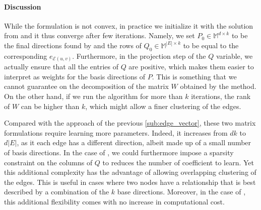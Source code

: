 \paragraph{Discussion}

While the \pqt{} formulation is not convex, in practice we initialize it with the solution from
\combined{} and it thus converge after few iterations. Namely, we set $P_0 \in \mathbb{M}^{d\times
k}$ to be the final directions found by \combined{} and the rows of $Q_0 \in \mathbb{M}^{|E|\times
k}$ to be equal to the corresponding $e_{\mathcal{E}(u,v)}$. Furthermore, in the projection
step of the $Q$ variable, we actually ensure that all the entries of $Q$ are positive, which makes
them easier to  interpret as weights for the basis directions of $P$. This is something that we
cannot guarantee on the decomposition of the matrix $W$ obtained by the \fwa{} method. On the other
hand, if we run the \fwa{} algorithm for more than $k$ iterations, the rank of $W$ can be higher
than $k$, which might allow a finer clustering of the edges.

Compared with the \combined{} approach of the previous \autoref{sub:edge_vector}, these two matrix
formulations require learning more parameters. Indeed, it increases from $dk$ to $d|E|$, as it each
edge has a different direction, albeit made up of a small number of basis directions. In the case of
\pqt{}, we could furthermore impose a sparsity constraint on the columns of $Q$ to reduces the
number of coefficient to learn. Yet this additional complexity has the advantage of allowing
overlapping clustering of the edges. This is useful in cases where two nodes have a relationship
that is best described by a combination of the $k$ base directions. Moreover, in the case of \fwa{},
this additional flexibility comes with no increase in computational cost.
